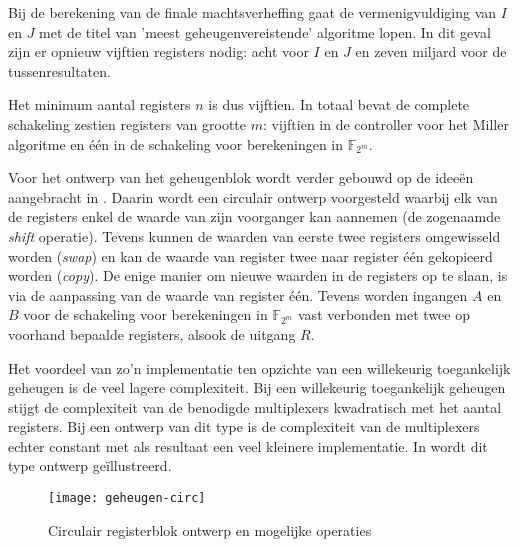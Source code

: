 Bij de berekening van de finale machtsverheffing gaat de vermenigvuldiging van $I$ en $J$ met de titel van 'meest geheugenvereistende' algoritme lopen. In dit geval zijn er opnieuw vijftien registers nodig: acht voor $I$ en $J$ en zeven miljard voor de tussenresultaten.

Het minimum aantal registers $n$ is dus vijftien. In totaal bevat de complete schakeling zestien registers van grootte $m$: vijftien in de controller voor het Miller algoritme en \'e\'en in de schakeling voor berekeningen in $\mathbb{F}_{2^m}$.

Voor het ontwerp van het geheugenblok wordt verder gebouwd op de idee\"en aangebracht in \cite{lee}. Daarin wordt een circulair ontwerp voorgesteld waarbij elk van de registers enkel de waarde van zijn voorganger kan aannemen (de zogenaamde \emph{shift} operatie). Tevens kunnen de waarden van eerste twee registers omgewisseld worden (\emph{swap}) en kan de waarde van register twee naar register \'e\'en gekopieerd worden (\emph{copy}). De enige manier om nieuwe waarden in de registers op te slaan, is via de aanpassing van de waarde van register \'e\'en. Tevens worden ingangen $A$ en $B$ voor de schakeling voor berekeningen in $\mathbb{F}_{2^m}$ vast verbonden met twee op voorhand bepaalde registers, alsook de uitgang $R$. 

Het voordeel van zo'n implementatie ten opzichte van een willekeurig toegankelijk geheugen is de veel lagere complexiteit. Bij een willekeurig toegankelijk geheugen stijgt de complexiteit van de benodigde multiplexers kwadratisch met het aantal registers. Bij een ontwerp van dit type is de complexiteit van de multiplexers echter constant met als resultaat een veel kleinere implementatie. In  wordt dit type ontwerp ge\"illustreerd.

\begin{figure}[h]
	\centering
		\texttt{[image: geheugen-circ]}
		\caption{Circulair registerblok ontwerp en mogelijke operaties\label{figuur-implementatie-miller-geheugen-circ}}
\end{figure}

